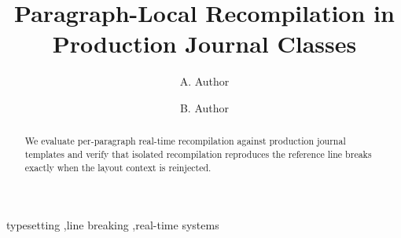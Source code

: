 \begin{frontmatter}
\title{Paragraph-Local Recompilation in Production Journal Classes}
\author[1]{A. Author}
\author[1]{B. Author}
\address[1]{Institute for Typesetting Research, Chennai, India}
\begin{abstract}
We evaluate per-paragraph real-time recompilation against production
journal templates and verify that isolated recompilation reproduces the
reference line breaks exactly when the layout context is reinjected.
\end{abstract}
\begin{keywords}
typesetting \sep line breaking \sep real-time systems
\end{keywords}
\end{frontmatter}
